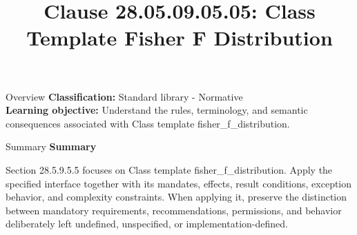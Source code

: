\documentclass[10pt,letterpaper]{article}
\title{Clause 28.05.09.05.05: Class Template Fisher F Distribution}
\author{}
\date{}
\begin{document}
\maketitle
\begin{CornellOverviewBox}{Overview}
\textbf{Classification:} Standard library - Normative\\[2pt]
\textbf{Learning objective:} Understand the rules, terminology, and semantic consequences associated with Class template fisher\_f\_distribution.
\end{CornellOverviewBox}\begin{CornellSummaryBox}{Summary}
{\sffamily\bfseries\color{Accent} Summary}\par\vspace{3pt}Section 28.5.9.5.5 focuses on Class template fisher\_f\_distribution. Apply the specified interface together with its mandates, effects, result conditions, exception behavior, and complexity constraints. When applying it, preserve the distinction between mandatory requirements, recommendations, permissions, and behavior deliberately left undefined, unspecified, or implementation-defined.
\end{CornellSummaryBox}
\end{document}
